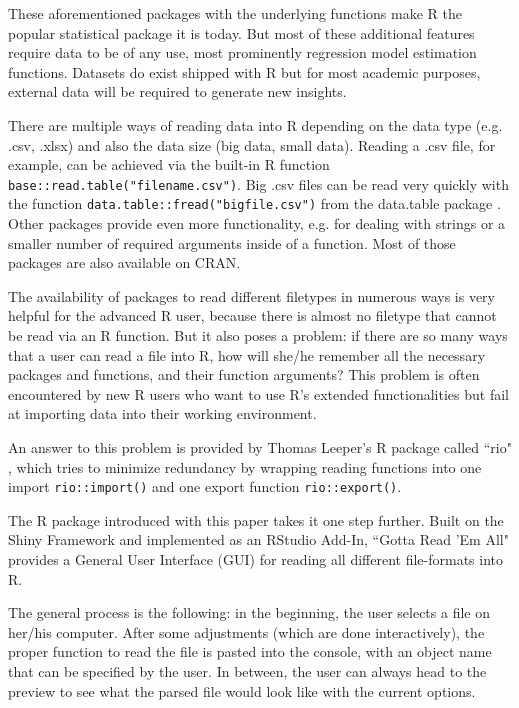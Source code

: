 \documentclass[12pt]{article} %
\newcommand{\li}{\lstinline}
\begin{document}
These aforementioned packages with the underlying functions make R the popular statistical package it is today. But most of these additional features require data to be of any use, most prominently regression model estimation functions. Datasets do exist shipped with R but for most academic purposes, external data will be required to generate new insights.

There are multiple ways of reading data into R depending on the data type (e.g. .csv, .xlsx) and also the data size (big data, small data). Reading a .csv file, for example, can be achieved via the built-in R function \li{base::read.table("filename.csv")}. Big .csv files can be read very quickly with the function \li{data.table::fread("bigfile.csv")} from the data.table package \cite[Dowle et al 2015]{w5}. Other packages provide even more functionality, e.g. for dealing with strings or a smaller number of required arguments inside of a function. Most of those packages are also available on CRAN. 

The availability of packages to read different filetypes in numerous ways is very helpful for the advanced R user, because there is almost no filetype that cannot be read via an R function. But it also poses a problem: if there are so many ways that a user can read a file into R, how will she/he remember all the necessary packages and functions, and their function arguments? This problem is often encountered by new R users who want to use R's extended functionalities but fail at importing data into their working environment.

An answer to this problem is provided by Thomas Leeper's R package called ``rio" \cite[Leeper et al 2016]{w6}, which tries to minimize redundancy by wrapping reading functions into one import \li{rio::import()} and one export function \li{rio::export()}. 

The R package introduced with this paper takes it one step further. Built on the Shiny Framework and implemented as an RStudio Add-In, ``Gotta Read 'Em All" provides a General User Interface (GUI) for reading all different file-formats into R. 

The general process is the following: in the beginning, the user selects a file on her/his computer. After some adjustments (which are done interactively), the proper function to read the file is pasted into the console, with an object name that can be specified by the user. In between, the user can always head to the preview to see what the parsed file would look like with the current options.
\end{document}
